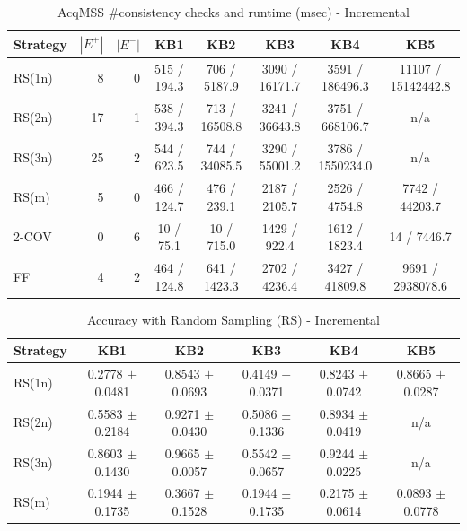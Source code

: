 \usepackage{booktabs}


\begin{table}[htbp]
\centering
\caption{AcqMSS \#consistency checks and runtime (msec) - Incremental}
\label{tab:table7_incremental}
\begin{tabular}{lrrccccc}
\toprule
Strategy & $|E^+|$ & $|E^-|$ & KB1 & KB2 & KB3 & KB4 & KB5 \\
\midrule
RS(1n) & 8 & 0 & 515 / 194.3 & 706 / 5187.9 & 3090 / 16171.7 & 3591 / 186496.3 & 11107 / 15142442.8 \\
RS(2n) & 17 & 1 & 538 / 394.3 & 713 / 16508.8 & 3241 / 36643.8 & 3751 / 668106.7 & n/a \\
RS(3n) & 25 & 2 & 544 / 623.5 & 744 / 34085.5 & 3290 / 55001.2 & 3786 / 1550234.0 & n/a \\
RS(m) & 5 & 0 & 466 / 124.7 & 476 / 239.1 & 2187 / 2105.7 & 2526 / 4754.8 & 7742 / 44203.7 \\
2-COV & 0 & 6 & 10 / 75.1 & 10 / 715.0 & 1429 / 922.4 & 1612 / 1823.4 & 14 / 7446.7 \\
FF & 4 & 2 & 464 / 124.8 & 641 / 1423.3 & 2702 / 4236.4 & 3427 / 41809.8 & 9691 / 2938078.6 \\
\bottomrule
\end{tabular}
\end{table}

\begin{table}[htbp]
\centering
\caption{Accuracy with Random Sampling (RS) - Incremental}
\label{tab:table9_incremental}
\begin{tabular}{lccccc}
\toprule
Strategy & KB1 & KB2 & KB3 & KB4 & KB5 \\
\midrule
RS(1n) & 0.2778 $\pm$ 0.0481 & 0.8543 $\pm$ 0.0693 & 0.4149 $\pm$ 0.0371 & 0.8243 $\pm$ 0.0742 & 0.8665 $\pm$ 0.0287 \\
RS(2n) & 0.5583 $\pm$ 0.2184 & 0.9271 $\pm$ 0.0430 & 0.5086 $\pm$ 0.1336 & 0.8934 $\pm$ 0.0419 & n/a \\
RS(3n) & 0.8603 $\pm$ 0.1430 & 0.9665 $\pm$ 0.0057 & 0.5542 $\pm$ 0.0657 & 0.9244 $\pm$ 0.0225 & n/a \\
RS(m) & 0.1944 $\pm$ 0.1735 & 0.3667 $\pm$ 0.1528 & 0.1944 $\pm$ 0.1735 & 0.2175 $\pm$ 0.0614 & 0.0893 $\pm$ 0.0778 \\
\bottomrule
\end{tabular}
\end{table}

